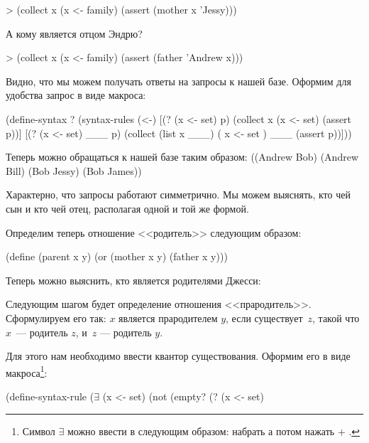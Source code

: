 \begin{SchemeCode}[emph={x}]
   > (collect x
       (x <- family)
       (assert (mother x 'Jessy)))
\end{SchemeCode}

\newpage
А кому является отцом Эндрю?
\begin{SchemeCode}[emph={x}]
   > (collect x 
       (x <- family)
       (assert (father 'Andrew x)))
\end{SchemeCode}

Видно, что мы можем получать ответы на запросы к нашей базе. Оформим для удобства запрос в виде макроса:
  
\begin{Definition}[emph={p,x,set}]
(define-syntax ?
  (syntax-rules (<-)
    [(? (x <- set) p) (collect x (x <- set) (assert p))]
    [(? (x <- set) ___ p) (collect (list x ___)
                            ( x <- set ) ___
                            (assert p))]))
\end{Definition}

Теперь можно обращаться к нашей базе таким образом:
{((Andrew Bob) (Andrew Bill) (Bob Jessy) (Bob James))}

Характерно, что запросы работают симметрично. Мы можем выяснять, кто чей сын и кто чей отец, располагая одной и той же формой.

Определим теперь отношение <<родитель>> следующим образом:
\begin{Definition}[emph={x,y}]
(define (parent x y)
  (or (mother x y)
      (father x y)))
\end{Definition}
Теперь можно выяснить, кто является родителями Джесси:

Следующим шагом будет определение отношения <<прародитель>>. Сформулируем его так: $x$ является прародителем $y$, если существует~$z$, такой что $x$~--- родитель $z$, и~$z$ --- родитель $y$. 

Для этого нам необходимо ввести квантор существования. Оформим его в виде макроса\footnote{Символ $\exists$ можно ввести в  следующим образом: набрать \s{\\exists} а потом нажать  + \s{\\}.}:

\begin{Definition}[emph={x,set,p}]
(define-syntax-rule ($\exists$ (x <- set) %
  (not (empty? (? (x <- set) %
\end{Definition}

